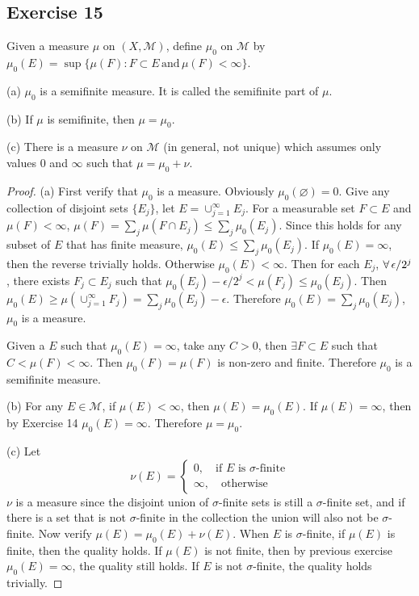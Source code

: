 \subsection*{Exercise 15}
Given a measure $\mu$ on $(X,\mathcal{M})$, define $\mu_0$ on $\mathcal{M}$ by $\mu_0(E)=\sup\{\mu(F):F\subset E\,\text{and}\,\mu(F)<\infty\}$.
\par (a) $\mu_0$ is a semifinite measure. It is called the semifinite part of $\mu$.
\par (b) If $\mu$ is semifinite, then $\mu=\mu_0$.
\par (c) There is a measure $\nu$ on $\mathcal{M}$ (in general, not unique) which assumes only values $0$ and $\infty$ such that $\mu=\mu_0+\nu$.
\begin{proof}
    (a) First verify that $\mu_0$ is a measure. Obviously $\mu_0(\varnothing)=0$. Give any collection of disjoint sets $\{E_j\}$, let $E=\cup_{j=1}^\infty E_j$. For a measurable set $F\subset E$ and $\mu(F)<\infty$, $\mu(F)=\sum_j\mu(F\cap E_j)\le\sum_j\mu_0(E_j)$. Since this holds for any subset of $E$ that has finite measure, $\mu_0(E)\le\sum_j\mu_0(E_j)$. If $\mu_0(E)=\infty$, then the reverse trivially holds. Otherwise $\mu_0(E)<\infty$. Then for each $E_j$, $\forall\, \epsilon/2^j$, there exists $F_j\subset E_j$ such that $\mu_0(E_j)-\epsilon/2^j<\mu(F_j)\le\mu_0(E_j)$. Then $\mu_0(E)\ge\mu(\cup_{j=1}^{\infty}F_j)=\sum_j\mu_0(E_j)-\epsilon$. Therefore $\mu_0(E)=\sum_j\mu_0(E_j)$, $\mu_0$ is a measure.
    
    Given a $E$ such that $\mu_0(E)=\infty$, take any $C>0$, then $\exists F\subset E$ such that $C<\mu(F)<\infty$. Then $\mu_0(F)=\mu(F)$ is non-zero and finite. Therefore $\mu_0$ is a semifinite measure.
    \par (b) For any $E\in\mathcal{M}$, if $\mu(E)<\infty$, then $\mu(E)=\mu_0(E)$. If $\mu(E)=\infty$, then by Exercise 14 $\mu_0(E)=\infty$. Therefore $\mu=\mu_0$.
    \par (c) Let 
    $$
    \nu(E)=\begin{cases}
        0,\quad\text{if $E$ is $\sigma$-finite}\\
        \infty,\quad\text{otherwise}
    \end{cases}
    $$
    $\nu$ is a measure since the disjoint union of $\sigma$-finite sets is still a $\sigma$-finite set, and if there is a set that is not $\sigma$-finite in the collection the union will also not be $\sigma$-finite. Now verify $\mu(E)=\mu_0(E)+\nu(E)$. When $E$ is $\sigma$-finite, if $\mu(E)$ is finite, then the quality holds. If $\mu(E)$ is not finite, then by previous exercise $\mu_0(E)=\infty$, the quality still holds. If $E$ is not $\sigma$-finite, the quality holds trivially.
\end{proof}
